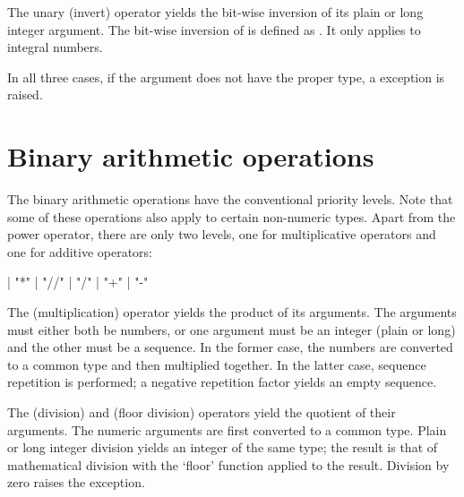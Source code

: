 The unary \code{\~} (invert) operator yields the bit-wise inversion
of its plain or long integer argument.  The bit-wise inversion of
 is defined as .  It only applies to integral
numbers.

In all three cases, if the argument does not have the proper type,
a  exception is raised.


\section{Binary arithmetic operations\label{binary}}

The binary arithmetic operations have the conventional priority
levels.  Note that some of these operations also apply to certain
non-numeric types.  Apart from the power operator, there are only two
levels, one for multiplicative operators and one for additive
operators:

\begin{productionlist}
             { |  "*" 
              |  "//" 
              |  "/" }
             { |  "+" 
              |  "-" }
\end{productionlist}

The \code{*} (multiplication) operator yields the product of its
arguments.  The arguments must either both be numbers, or one argument
must be an integer (plain or long) and the other must be a sequence.
In the former case, the numbers are converted to a common type and
then multiplied together.  In the latter case, sequence repetition is
performed; a negative repetition factor yields an empty sequence.

The \code{/} (division) and \code{//} (floor division) operators yield
the quotient of their arguments.  The numeric arguments are first
converted to a common type.  Plain or long integer division yields an
integer of the same type; the result is that of mathematical division
with the `floor' function applied to the result.  Division by zero
raises the
 exception.

